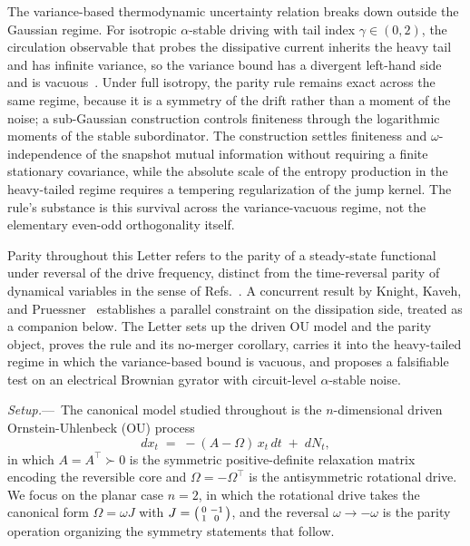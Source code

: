 \documentclass[%
 reprint,
 superscriptaddress,
 nofootinbib,
 nobibnotes,
 amsmath,amssymb,
 aps,
 prl,
 floatfix,
]{revtex4-2}
\newcommand{\plsection}[1]{\par\medskip\noindent\textit{#1.}---\,\ignorespaces}
\begin{document}
The variance-based thermodynamic uncertainty relation breaks down outside the Gaussian regime. For isotropic $\alpha$-stable driving with tail index $\gamma \in (0, 2)$, the circulation observable that probes the dissipative current inherits the heavy tail and has infinite variance, so the variance bound has a divergent left-hand side and is vacuous~\cite{Vo2025}. Under full isotropy, the parity rule remains exact across the same regime, because it is a symmetry of the drift rather than a moment of the noise; a sub-Gaussian construction controls finiteness through the logarithmic moments of the stable subordinator. The construction settles finiteness and $\omega$-independence of the snapshot mutual information without requiring a finite stationary covariance, while the absolute scale of the entropy production in the heavy-tailed regime requires a tempering regularization of the jump kernel. The rule's substance is this survival across the variance-vacuous regime, not the elementary even-odd orthogonality itself.

Parity throughout this Letter refers to the parity of a steady-state functional under reversal of the drive frequency, distinct from the time-reversal parity of dynamical variables in the sense of Refs.~\cite{Lee2013,Kim2022}. A concurrent result by Knight, Kaveh, and Pruessner~\cite{Knight2026} establishes a parallel constraint on the dissipation side, treated as a companion below. The Letter sets up the driven OU model and the parity object, proves the rule and its no-merger corollary, carries it into the heavy-tailed regime in which the variance-based bound is vacuous, and proposes a falsifiable test on an electrical Brownian gyrator with circuit-level $\alpha$-stable noise.

\plsection{Setup}%
The canonical model studied throughout is the $n$-dimensional driven Ornstein-Uhlenbeck (OU) process
\begin{equation}\label{eq:OU}
dx_t \;=\; -(A - \Omega)\,x_t\,dt \;+\; dN_t,
\end{equation}
in which $A = A^\top \succ 0$ is the symmetric positive-definite relaxation matrix encoding the reversible core and $\Omega = -\Omega^\top$ is the antisymmetric rotational drive. We focus on the planar case $n=2$, in which the rotational drive takes the canonical form $\Omega = \omega J$ with $J = \begin{psmallmatrix}0 & -1 \\ 1 & 0\end{psmallmatrix}$, and the reversal $\omega \to -\omega$ is the parity operation organizing the symmetry statements that follow.
\end{document}
